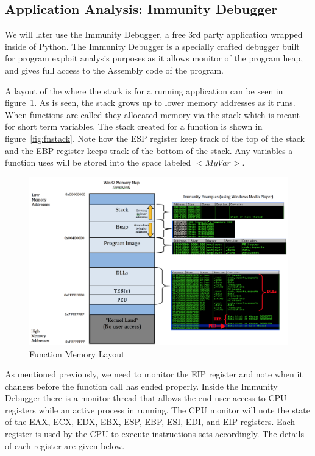 \documentclass[12pt]{article}
\begin{document}
\subsection{Application Analysis: Immunity Debugger}
\label{sec:approachimmunity}

We will later use the Immunity Debugger, a free 3rd party application wrapped
inside of Python. The Immunity Debugger is a specially crafted debugger 
built for program exploit analysis purposes as it allows monitor of the 
program heap, and gives full access to the Assembly code of the program. 

A layout of the where the stack is for a running application can be seen in 
figure~\ref{fig:thestack}. As is seen, the stack grows up to lower memory 
addresses as it runs. When functions are called they allocated memory via 
the stack which is meant for short term variables. The stack created for
a function is shown in figure~\ref{fig:fnstack}. Note how the ESP register
keep track of the top of the stack and the EBP register keeps track of 
the bottom of the stack. Any variables a function uses will be stored
into the space labeled $<MyVar>$. 

\begin{figure}[H]
    \centering
    \includegraphics[width=5.5in]{images/windowsexploitdevel.png}
    \caption{Function Memory Layout \cite{Czumak2013}}
    \label{fig:thestack}
\end{figure}

As mentioned previously, we need to monitor the EIP register and note when 
it changes before the function call has ended properly. Inside the Immunity
Debugger there is a monitor thread that allows the end user access to CPU
registers while an active process in running. The CPU monitor will note
the state of the EAX, ECX, EDX, EBX, ESP, EBP, ESI, EDI, and EIP registers.
Each register is used by the CPU to execute instructions sets accordingly. 
The details of each register are given below.
\end{document}
